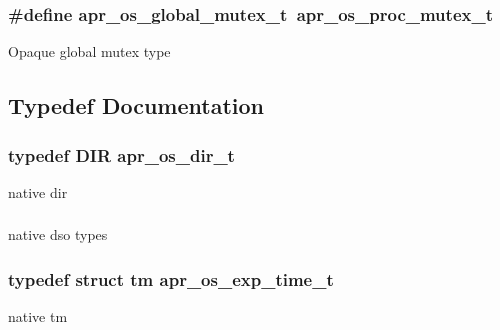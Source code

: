 \subsubsection[{\texorpdfstring{apr\+\_\+os\+\_\+global\+\_\+mutex\+\_\+t}{apr_os_global_mutex_t}}]{\setlength{\rightskip}{0pt plus 5cm}\#define apr\+\_\+os\+\_\+global\+\_\+mutex\+\_\+t~{\bf apr\+\_\+os\+\_\+proc\+\_\+mutex\+\_\+t}}\hypertarget{group__apr__portabile_gadd3a9818afc16248c3c30f22e19838dd}{}\label{group__apr__portabile_gadd3a9818afc16248c3c30f22e19838dd}
Opaque global mutex type 

\subsection{Typedef Documentation}
\subsubsection[{\texorpdfstring{apr\+\_\+os\+\_\+dir\+\_\+t}{apr_os_dir_t}}]{\setlength{\rightskip}{0pt plus 5cm}typedef D\+IR {\bf apr\+\_\+os\+\_\+dir\+\_\+t}}\hypertarget{group__apr__portabile_gacb790646cfc3da1b43a5f7c4bfaa3937}{}\label{group__apr__portabile_gacb790646cfc3da1b43a5f7c4bfaa3937}
native dir 
\subsubsection[{\texorpdfstring{apr\+\_\+os\+\_\+dso\+\_\+handle\+\_\+t}{apr_os_dso_handle_t}}]{}\hypertarget{group__apr__portabile_ga542684803ee8ab0abd69077697599ec0}{}\label{group__apr__portabile_ga542684803ee8ab0abd69077697599ec0}
native dso types 
\subsubsection[{\texorpdfstring{apr\+\_\+os\+\_\+exp\+\_\+time\+\_\+t}{apr_os_exp_time_t}}]{\setlength{\rightskip}{0pt plus 5cm}typedef struct tm {\bf apr\+\_\+os\+\_\+exp\+\_\+time\+\_\+t}}\hypertarget{group__apr__portabile_ga0fa9349212690591b09a0cbea7b61bdd}{}\label{group__apr__portabile_ga0fa9349212690591b09a0cbea7b61bdd}
native tm 
